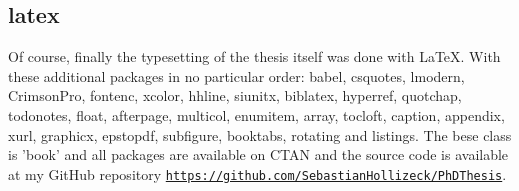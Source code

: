 {\subsection*{latex}
Of course, finally the typesetting of the thesis itself was done with \LaTeX. With these additional packages in no particular order: babel, csquotes, lmodern, CrimsonPro, fontenc, xcolor, hhline, siunitx, biblatex, hyperref, quotchap, todonotes, float, afterpage, multicol, enumitem, array, tocloft, caption, appendix, xurl, graphicx, epstopdf, subfigure, booktabs, rotating and listings. 
The bese class is 'book' and all packages are available on CTAN and the source code is available at my GitHub repository \href{https://github.com/SebastianHollizeck/PhDThesis}{\nolinkurl{https://github.com/SebastianHollizeck/PhDThesis}}.

}

